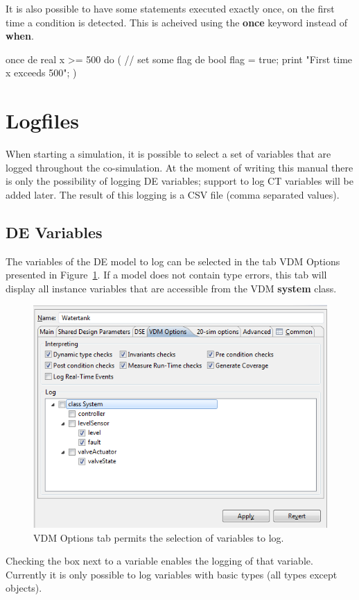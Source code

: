 \documentclass{crescendorepchap}
\newcommand{\vdmkeyw}[1]{{\bf\ttfamily #1}}
\begin{document}
It is also possible to have some statements executed exactly once, on
the first time a condition is detected. This is acheived using the
\vdmkeyw{once} keyword instead of \vdmkeyw{when}.

\begin{dcl}
once de real x >= 500 do
(
// set some flag
de bool flag = true;
print "First time x exceeds 500";
)
\end{dcl}

\section{Logfiles}\label{sec:Logfiles}

When starting a simulation, it is possible to select a set of variables
that are logged throughout the co-simulation. At the moment of writing this manual
there is only the possibility of logging DE variables;
support to log CT variables will be added later. The result of this
logging is a CSV file (comma separated values).

\subsection{DE Variables}

The variables of the DE model to log can be selected in the tab VDM
Options presented in Figure~\ref{fig:logvariables}. If a model does not contain type
errors, this tab will display all instance variables that are accessible
from the VDM \vdmkeyw{system} class.

\begin{figure}[htbp]
\centering
\includegraphics[width=.6\textwidth]{images/Destecsloggingvariables.PNG}
\caption{VDM Options tab permits the selection of variables to log.}
\label{fig:logvariables}
\end{figure}

Checking the box next to a variable enables the logging of that
variable. Currently it is only possible to log variables with basic
types (all types except objects).
\end{document}
